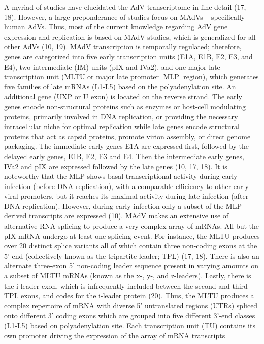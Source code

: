 \documentclass[
]{article}
\begin{document}
A myriad of studies have elucidated the AdV transcriptome in fine detail
(17, 18). However, a large preponderance of studies focus on MAdVs --
specifically human AdVs. Thus, most of the current knowledge regarding
AdV gene expression and replication is based on MAdV studies, which is
generalized for all other AdVs (10, 19). MAdV transcription is
temporally regulated; therefore, genes are categorized into five early
transcription units (E1A, E1B, E2, E3, and E4), two intermediate (IM)
units (pIX and IVa2), and one major late transcription unit (MLTU or
major late promoter {[}MLP{]} region), which generates five families of
late mRNAs (L1-L5) based on the polyadenylation site. An additional gene
(UXP or U exon) is located on the reverse strand. The early genes encode
non-structural proteins such as enzymes or host-cell modulating
proteins, primarily involved in DNA replication, or providing the
necessary intracellular niche for optimal replication while late genes
encode structural proteins that act as capsid proteins, promote virion
assembly, or direct genome packaging. The immediate early genes E1A are
expressed first, followed by the delayed early genes, E1B, E2, E3 and
E4. Then the intermediate early genes, IVa2 and pIX are expressed
followed by the late genes (10, 17, 18). It is noteworthy that the MLP
shows basal transcriptional activity during early infection (before DNA
replication), with a comparable efficiency to other early viral
promoters, but it reaches its maximal activity during late infection
(after DNA replication). However, during early infection only a subset
of the MLP-derived transcripts are expressed (10). MAdV makes an
extensive use of alternative RNA splicing to produce a very complex
array of mRNAs. All but the pIX mRNA undergo at least one splicing
event. For instance, the MLTU produces over 20 distinct splice variants
all of which contain three non-coding exons at the 5'-end (collectively
known as the tripartite leader; TPL) (17, 18). There is also an
alternate three-exon 5' non-coding leader sequence present in varying
amounts on a subset of MLTU mRNAs (known as the x-, y-, and z-leaders).
Lastly, there is the i-leader exon, which is infrequently included
between the second and third TPL exons, and codes for the i-leader
protein (20). Thus, the MLTU produces a complex repertoire of mRNA with
diverse 5' untranslated regions (UTRs) spliced onto different 3' coding
exons which are grouped into five different 3'-end classes (L1-L5) based
on polyadenylation site. Each transcription unit (TU) contains its own
promoter driving the expression of the array of mRNA transcripts
\end{document}
